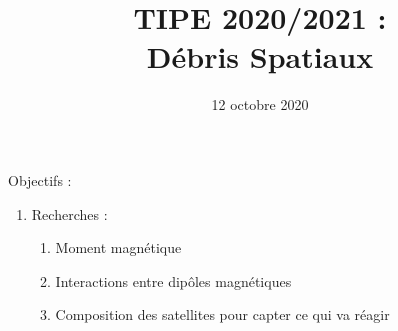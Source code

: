 \documentclass[a4paper,1pt]{article}
\title{TIPE 2020/2021 : \\ Débris Spatiaux}
\date{12 octobre 2020}
\begin{document}
\maketitle

Objectifs :
\begin{enumerate}
    \item Recherches : 
    \begin{enumerate}
        \item Moment magnétique
        \item Interactions entre dipôles magnétiques
        \item Composition des satellites pour capter ce qui va réagir
    \end{enumerate}
\end{enumerate}
\end{document}
